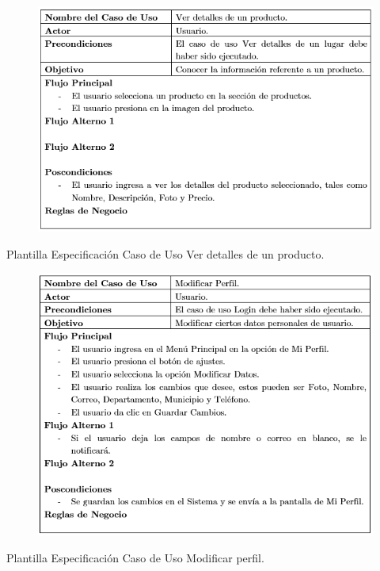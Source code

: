 \documentclass[12pt,letterpaper,openany]{book}
\begin{document}
\begin{table}[H]
\begin{center}
\begin{figure}[H]
\begin{center}
\includegraphics[width=13cm]{./imagenes/PCU/ver_detalles_producto}
\end{center}
\end{figure}
\end{center}
\caption{Plantilla Especificación Caso de Uso Ver detalles de un producto.}
\end{table}

\begin{table}[H]
\begin{center}
\begin{figure}[H]
\begin{center}
\includegraphics[width=13cm]{./imagenes/PCU/modificar_perfil}
\end{center}
\end{figure}
\end{center}
\caption{Plantilla Especificación Caso de Uso Modificar perfil.}
\end{table}
\end{document}
